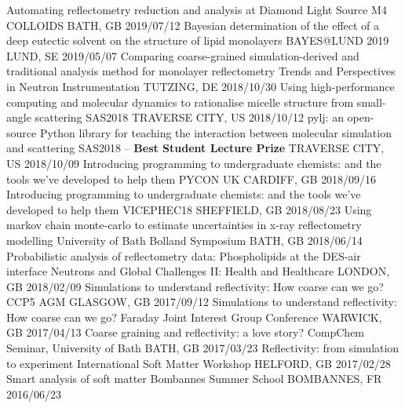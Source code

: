 \begin{cvhonors} 
  \cvhonor
    {Automating reflectometry reduction and analysis at Diamond Light Source}
    {M4 COLLOIDS}
    {BATH, GB}
    {2019/07/12}
  \cvhonor
    {Bayesian determination of the effect of a deep eutectic solvent on the structure of lipid monolayers}
    {BAYES@LUND 2019}
    {LUND, SE}
    {2019/05/07}
  \cvhonor
    {Comparing coarse-grained simulation-derived and traditional analysis method for monolayer reflectometry}
    {Trends and Perspectives in Neutron Instrumentation}
    {TUTZING, DE}
    {2018/10/30} 
  \cvhonor
    {Using high-performance computing and molecular dynamics to rationalise micelle structure from small-angle scattering}
    {SAS2018}
    {TRAVERSE CITY, US}
    {2018/10/12}
  \cvhonor
    {pylj: an open-source Python library for teaching the interaction between molecular simulation and scattering}
	{SAS2018 -- \textbf{Best Student Lecture Prize}}
    {TRAVERSE CITY, US}
    {2018/10/09}
  \cvhonor
    {Introducing programming to undergraduate chemists: and the tools we've developed to help them}
    {PYCON UK}
    {CARDIFF, GB}
    {2018/09/16}
  \cvhonor
    {Introducing programming to undergraduate chemists: and the tools we've developed to help them}
    {VICEPHEC18}
    {SHEFFIELD, GB}
    {2018/08/23}
  \cvhonor
    {Using markov chain monte-carlo to estimate uncertainties in x-ray reflectometry modelling}
    {University of Bath Bolland Symposium}
    {BATH, GB}
    {2018/06/14}
  \cvhonor
    {Probabilistic analysis of reflectometry data: Phospholipids at the DES-air interface}
    {Neutrons and Global Challenges II: Health and Healthcare}
    {LONDON, GB}
    {2018/02/09}
  \cvhonor
    {Simulations to understand reflectivity: How coarse can we go?}
    {CCP5 AGM}
    {GLASGOW, GB}
    {2017/09/12}
  \cvhonor
    {Simulations to understand reflectivity: How coarse can we go?}
    {Faraday Joint Interest Group Conference}
    {WARWICK, GB}
    {2017/04/13}
  \cvhonor
    {Coarse graining and reflectivity: a love story?}
    {CompChem Seminar, University of Bath}
    {BATH, GB}
    {2017/03/23}
  \cvhonor
    {Reflectivity: from simulation to experiment}
    {International Soft Matter Workshop}
    {HELFORD, GB}
    {2017/02/28}
  \cvhonor
    {Smart analysis of soft matter}
    {Bombannes Summer School}
    {BOMBANNES, FR}
    {2016/06/23}
\end{cvhonors}
